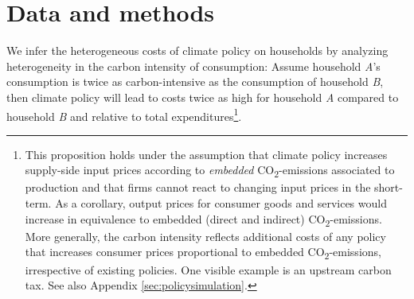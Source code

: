 \documentclass[12pt, a4paper]{article}
\begin{document}


\section{Data and methods} \label{sec:data_methods}

We infer the heterogeneous costs of climate policy on households by analyzing heterogeneity in the carbon intensity of consumption: Assume household \textit{A}'s consumption is twice as carbon-intensive as the consumption of household \textit{B}, then climate policy will lead to costs twice as high for household \textit{A} compared to household \textit{B} and relative to total expenditures\footnote{This proposition holds under the assumption that climate policy increases supply-side input prices according to \textit{embedded} CO\textsubscript{2}-emissions associated to production and that firms cannot react to changing input prices in the short-term. As a corollary, output prices for consumer goods and services would increase in equivalence to embedded (direct and indirect) CO\textsubscript{2}-emissions. More generally, the carbon intensity reflects additional costs of any policy that increases consumer prices proportional to embedded CO\textsubscript{2}-emissions, irrespective of existing policies. One visible example is an upstream carbon tax. See also Appendix \ref{sec:policysimulation}.}.
\end{document}
